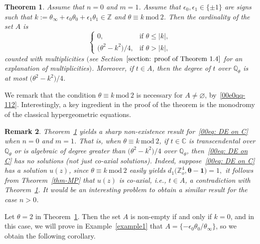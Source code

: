 \documentclass[10pt,a4paper]{amsart}
\numberwithin{equation}{section}
\newtheorem{Theorem}{Theorem}[section]
\newtheorem{Remark}[Theorem]{Remark} }
\def\C{\mathbb C}
\def\Q{\mathbb Q}
\def\Z{\mathbb Z}
\def\mod{\ \mathrm{mod}\ }
\begin{document}
\begin{Theorem} \label{theorem: sharp}
 Assume that $n=0$ and $m=1$. Assume that
 $\epsilon_0,\epsilon_1\in\{\pm1\}$ are signs such that
 $k:=\theta_\infty+\epsilon_0\theta_0+\epsilon_1\theta_1\in\Z$ and
 $\theta\equiv k\mod 2$. Then the cardinality of the set $A$ is
 \[
 \begin{cases}
 0, &\text{if }\theta\le|k|, \\
 \bigl(\theta^2-k^2\bigr)/4, &\text{if }\theta>|k|, \end{cases}
 \]
 counted with multiplicities $($see Section~$\ref{section: proof of
 Theorem 1.4}$ for an explanation of
 multiplicities$)$. Moreover, if ${t\in A}$, then the degree of $t$ over
 $\Q_\theta$ is at most $\bigl(\theta^2-k^2\bigr)/4$.
\end{Theorem}

We remark that the condition $\theta\equiv k\mod 2$ is necessary for
$A\neq\varnothing$, by~\eqref{00e0qq-112}. Interestingly, a key
ingredient in the proof of the theorem is the monodromy of the
classical hypergeometric equations.


\begin{Remark} Theorem~\ref{theorem: sharp} yields a sharp non-existence
result for~\eqref{00eq: DE on C} when $n=0$ and $m=1$. That is,
when $\theta\equiv k\mod 2$, if $t\in\C$ is transcendental over
$\Q_\theta$ or is algebraic of degree greater than $\bigl(\theta^2-k^2\bigr)/4$
over $\Q_\theta$, then~\eqref{00eq: DE on C} has no solutions (not just co-axial solutions). Indeed, suppose~\eqref{00eq: DE on C} has a solution $u(z)$, since $\theta\equiv k\mod 2$ easily yields $d_1\bigl(\Z_o^{4},{\boldsymbol\theta-\boldsymbol 1}\bigr)=1,$ it follows from Theorem~\ref{thm-MP} that $u(z)$ is co-axial, i.e., $t\in A$, a contradiction with Theorem~\ref{theorem: sharp}.
 It would be an interesting problem to obtain a similar result for the
case $n>0$.\end{Remark}

Let $\theta=2$ in Theorem~\ref{theorem: sharp}. Then the set $A$ is non-empty
 if and only if $k=0$, and in this case, we will prove in Example~\ref{example1} that $A=\{-\epsilon_0\theta_0/\theta_\infty\}$, so we obtain the following corollary.
\end{document}
